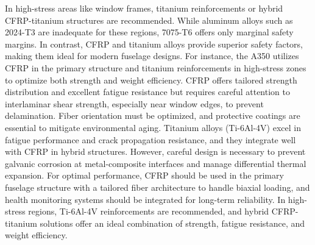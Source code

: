 \documentclass[a4paper,11pt]{article}
\begin{document}
In high-stress areas like window frames, titanium reinforcements or hybrid CFRP-titanium structures are recommended. While aluminum alloys such as 2024-T3 are inadequate for these regions, 7075-T6 offers only marginal safety margins. In contrast, CFRP and titanium alloys provide superior safety factors, making them ideal for modern fuselage designs. For instance, the A350 utilizes CFRP \cite{airbus_a350} in the primary structure and titanium reinforcements in high-stress zones to optimize both strength and weight efficiency. CFRP offers tailored strength distribution and excellent fatigue resistance but requires careful attention to interlaminar shear strength\cite{ecrc_template}, especially near window edges, to prevent delamination. Fiber orientation must be optimized, and protective coatings are essential to mitigate environmental aging. Titanium alloys (Ti-6Al-4V) excel in fatigue performance and crack propagation resistance, and they integrate well with CFRP in hybrid structures. However, careful design is necessary to prevent galvanic corrosion at metal-composite interfaces and manage differential thermal expansion. For optimal performance, CFRP should be used in the primary fuselage structure with a tailored fiber architecture to handle biaxial loading, and health monitoring systems should be integrated for long-term reliability. In high-stress regions, Ti-6Al-4V reinforcements are recommended, and hybrid CFRP-titanium solutions offer an ideal combination of strength, fatigue resistance, and weight efficiency.
\end{document}
